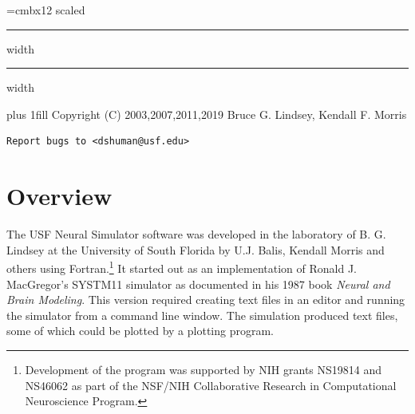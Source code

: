 \documentclass[12pt,openany,oneside]{book}
\newcommand{\ticite}[1]{\textit{#1}}
\begin{document}
{}

\begin{titlepage}
\begingroup
\parindent=0pt
\font\titlefont=cmbx12 scaled 
\leftline{\titlefont{}}
\vskip4pt \hrule height 4pt width \hsize \vskip4pt
\vskip4pt \hrule height 2pt width \hsize \vskip2pc
\par\vfill
\pagebreak
\begin{versionhistory}
\end{versionhistory}
\thispagestyle{empty}

\vglue 0pt plus 1fill
Copyright (C) 2003,2007,2011,2019 Bruce G. Lindsey, Kendall F. Morris
\begin{verbatim}
Report bugs to <dshuman@usf.edu>
\end{verbatim}
\endgroup
\end{titlepage}

\lhead[]{\leftmark}
\rhead[]{}
\tableofcontents
\newpage

\lhead[]{\leftmark}
\rhead[\leftmark]{}
\fancyfoot[C]{\thepage}
\setlength{\headheight}{14.5pt}
\chapter{Overview}
The USF Neural Simulator software was developed in the laboratory of B. G.
Lindsey at the University of South Florida by U.J. Balis, Kendall Morris
and others using Fortran.\footnote{Development of the program was
supported by NIH grants NS19814 and NS46062 as part of the NSF/NIH
Collaborative Research in Computational Neuroscience Program.} It started
out as an implementation of Ronald J.  MacGregor's SYSTM11 simulator as
documented in his 1987 book \ticite{Neural and Brain Modeling}. This
version required creating text files in an editor and running the
simulator from a command line window.  The simulation produced text files,
some of which could be plotted by a plotting program. 
\end{document}
